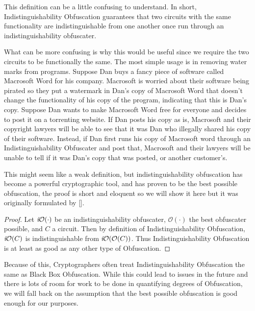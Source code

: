 \documentclass[12pt,twoside]{reedthesis}
\begin{document}
    \par This definition can be a little confusing to understand. In short, Indistinguishability Obfuscation guarantees that two circuits with the same functionality are indistinguishable from one another once run through an indistinguishability obfuscater. 
    \par What can be more confusing is why this would be useful since we require the two circuits to be functionally the same. The most simple usage is in removing water marks from programs. Suppose Dan buys a fancy piece of software called Macrosoft Word for his company. Macrosoft is worried about their software being pirated so they put a watermark in Dan's copy of Macrosoft Word that doesn't change the functionality of his copy of the program, indicating that this is Dan's copy. Suppose Dan wants to make Macrosoft Word free for everyone and decides to post it on a torrenting website. If Dan posts his copy as is, Macrosoft and their copyright lawyers will be able to see that it was Dan who illegally shared his copy of their software. Instead, if Dan first runs his copy of Macrosoft word through an Indistinguishability Obfuscater and post that, Macrosoft and their lawyers will be unable to tell if it was Dan's copy that was posted, or another customer's.
    \par This might seem like a weak definition, but indistinguishability obfuscation has become a powerful cryptographic tool, and has proven to be the best possible obfuscation, the proof is short and eloquent so we will show it here but it was originally formulated by [\cite{Goldwasser:2007:BO:1760749.1760765}].
    
    \newcommand{\Oh}[0]{\mathcal{O}}
    \begin{proof}
    Let $\textit{i}\mathcal{O}(\cdot)$ be an indistinguishability obfuscater, $\Oh(\cdot)$ the best obfuscater possible, and $C$ a circuit. Then by definition of Indistinguishability Obfuscation, $\textit{i}\mathcal{O}(C)$ is indistinguishable from $\iO(\Oh(C))$. Thus Indistinguishability Obfuscation is at least as good as any other type of Obfuscation.
    \end{proof}
    
    Because of this, Cryptographers often treat Indistinguishability Obfuscation the same as Black Box Obfuscation. While this could lead to issues in the future and there is lots of room for work to be done in quantifying degrees of Obfuscation, we will fall back on the assumption that the best possible obfuscation is good enough for our purposes.
    
\end{document}
